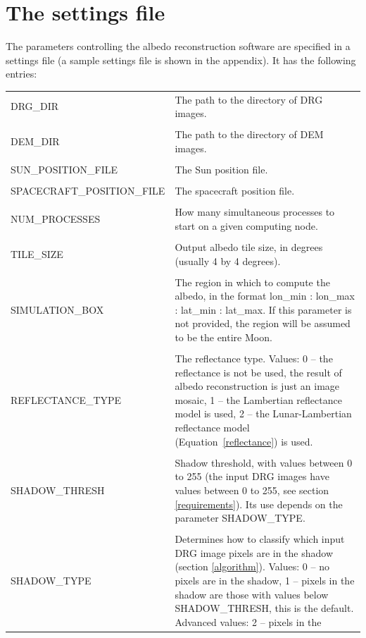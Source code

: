 \documentclass[letterpaper,fleqn,11pt]{report}
\begin{document}
\section{The settings file}\label{settings}

The parameters controlling the albedo reconstruction software are specified in a
settings file (a sample settings file is shown in the appendix). It has the following entries:

\begin{longtable}{ l p{7cm} }
DRG\_DIR & The path to the directory of DRG images. \\
\\
DEM\_DIR & The path to the directory of DEM images. \\
\\
SUN\_POSITION\_FILE  & The Sun position file.  \\
\\
SPACECRAFT\_POSITION\_FILE & The spacecraft position file.  \\
\\
NUM\_PROCESSES & How many simultaneous processes to start on a given
computing node. \\
\\
TILE\_SIZE & Output albedo tile size, in degrees (usually 4 by 4 degrees). \\
\\
SIMULATION\_BOX &         The region in which to compute the albedo, in
the format lon\_min : lon\_max : lat\_min : lat\_max. If this
parameter is not provided, the region will be assumed to be the entire Moon. \\
\\
REFLECTANCE\_TYPE &
The reflectance type. Values: 0 -- the reflectance is not
be used, the result of albedo reconstruction is just an image mosaic, 1 --
the Lambertian reflectance model is used, 2 -- the Lunar-Lambertian
reflectance model (Equation~\ref{reflectance}) is used.\\
\\
SHADOW\_THRESH    &         
 Shadow threshold, with values between 0 to 255 (the input DRG images
 have values between 0 to 255, see section \ref{requirements}). Its
 use depends on the parameter SHADOW\_TYPE.
\\
\\
SHADOW\_TYPE & Determines how to classify which input DRG image pixels are in
the shadow (section \ref{algorithm}). Values: 0 -- no pixels are in
the shadow, 1 -- pixels in the shadow are those with values below
SHADOW\_THRESH, this is the default. Advanced values: 2 -- pixels in the

\end{longtable}
\end{document}
